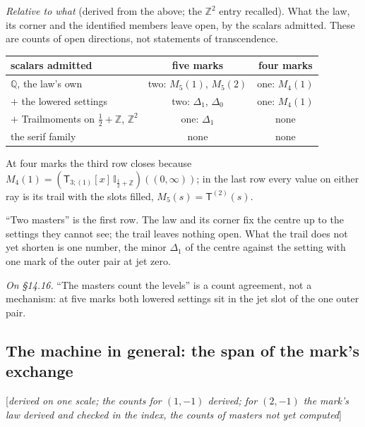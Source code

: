 \documentclass[11pt]{article}
\newcommand{\sT}{\mathsf T}
\newcommand{\Ilat}[1]{\mathbb I_{#1}}
\newcommand{\Tx}[3]{(\sT_{#1;(1)}[x]\,#2)((#3,\infty))}
\newcommand{\status}[1]{\hfill{\small[\textit{#1}]}}
\theoremstyle{plain}
\theoremstyle{remark}
\begin{document}
\emph{Relative to what} (derived from the above; the $\mathbb Z^2$ entry recalled). What the law, its corner and the identified members leave open, by the scalars admitted. These are counts of open directions, not statements of transcendence.
\begin{center}
\begin{tabular}{lcc}
scalars admitted & five marks & four marks\\\hline
$\mathbb Q$, the law's own & two: $M_5(1)$, $M_5(2)$ & one: $M_4(1)$\\
$+$ the lowered settings & two: $\Delta_1$, $\Delta_0$ & one: $M_4(1)$\\
$+$ Trailmoments on $\frac12+\mathbb Z$, $\mathbb Z^2$ & one: $\Delta_1$ & none\\
the serif family & none & none
\end{tabular}
\end{center}
At four marks the third row closes because $M_4(1)=\Tx3{\Ilat{\frac12+\mathbb Z}}0$; in the last row every value on either ray is its trail with the slots filled, $M_5(s)=\sT^{(2)}(s)$.

``Two masters'' is the first row. The law and its corner fix the centre up to the settings they cannot see; the trail leaves nothing open. What the trail does not yet shorten is one number, the minor $\Delta_1$ of the centre against the setting with one mark of the outer pair at jet zero.

\emph{On \S14.16.} ``The masters count the levels'' is a count agreement, not a mechanism: at five marks both lowered settings sit in the jet slot of the one outer pair.

\subsection{The machine in general: the span of the mark's exchange}\status{derived on one scale; the counts for $(1,-1)$ derived; for $(2,-1)$ the mark's law derived and checked in the index, the counts of masters not yet computed}
\end{document}
